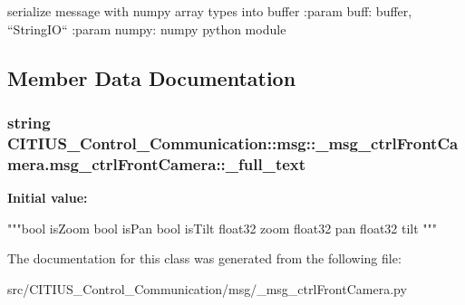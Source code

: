 \begin{DoxyVerb}
serialize message with numpy array types into buffer
:param buff: buffer, ``StringIO``
:param numpy: numpy python module
\end{DoxyVerb}
 

\subsection{\-Member \-Data \-Documentation}
\hypertarget{class_c_i_t_i_u_s___control___communication_1_1msg_1_1__msg__ctrl_front_camera_1_1msg__ctrl_front_camera_ab81cd662d50d955c15a0c037d18d0777}{
\subsubsection[{\-\_\-full\-\_\-text}]{\setlength{\rightskip}{0pt plus 5cm}string \-C\-I\-T\-I\-U\-S\-\_\-\-Control\-\_\-\-Communication\-::msg\-::\-\_\-msg\-\_\-ctrl\-Front\-Camera.\-msg\-\_\-ctrl\-Front\-Camera\-::\-\_\-full\-\_\-text}}\label{class_c_i_t_i_u_s___control___communication_1_1msg_1_1__msg__ctrl_front_camera_1_1msg__ctrl_front_camera_ab81cd662d50d955c15a0c037d18d0777}
{\bfseries \-Initial value\-:}
\begin{DoxyCode}
"""bool isZoom
bool isPan
bool isTilt
float32 zoom
float32 pan
float32 tilt
"""
\end{DoxyCode}


\-The documentation for this class was generated from the following file\-:\begin{DoxyCompactItemize}
\item 
src/\-C\-I\-T\-I\-U\-S\-\_\-\-Control\-\_\-\-Communication/msg/\-\_\-msg\-\_\-ctrl\-Front\-Camera.\-py\end{DoxyCompactItemize}
